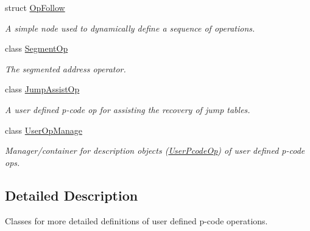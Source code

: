 \begin{DoxyCompactItemize}
struct \mbox{\hyperlink{struct_op_follow}{Op\+Follow}}
\begin{DoxyCompactList}\small\item\em A simple node used to dynamically define a sequence of operations. \end{DoxyCompactList}\item 
class \mbox{\hyperlink{class_segment_op}{Segment\+Op}}
\begin{DoxyCompactList}\small\item\em The {\itshape segmented} {\itshape address} operator. \end{DoxyCompactList}\item 
class \mbox{\hyperlink{class_jump_assist_op}{Jump\+Assist\+Op}}
\begin{DoxyCompactList}\small\item\em A user defined p-\/code op for assisting the recovery of jump tables. \end{DoxyCompactList}\item 
class \mbox{\hyperlink{class_user_op_manage}{User\+Op\+Manage}}
\begin{DoxyCompactList}\small\item\em Manager/container for description objects (\mbox{\hyperlink{class_user_pcode_op}{User\+Pcode\+Op}}) of user defined p-\/code ops. \end{DoxyCompactList}\end{DoxyCompactItemize}


\subsection{Detailed Description}
Classes for more detailed definitions of user defined p-\/code operations. 

